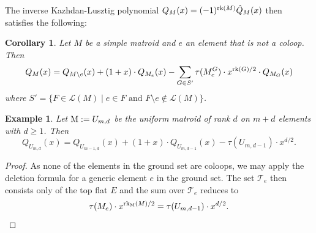 \documentclass[11pt]{article}
\newcommand{\calL}{\mathcal{L}}
\newcommand{\rank}{\normalfont\text{rk}}
\newcommand{\M}{\normalfont\text{M}}
\newcommand{\rk}{\normalfont\text{rk}}
\newtheorem{corollary}[theorem]{Corollary}
\newtheorem{example}[theorem]{Example}
\theoremstyle{remark}
\begin{document}
The inverse Kazhdan-Lusztig polynomial $Q_M(x) = (-1)^{\rank(M)}\hat{Q}_M(x)$ then satisfies the following:
\begin{corollary}
    \label{cor:deletion_formula_Q}
    Let $M$ be a simple matroid and $e$ an element that is not a coloop. Then
    \[
        Q_M(x) = Q_{M\setminus e}(x) + (1 + x)\cdot Q_{M_e}(x) -
        \sum_{G \in S'}{\tau(M^G_e)\cdot x^{\rank(G)/2} \cdot
            Q_{M_G}(x)}
    \]
    where $S' = \{F\in \calL(M)\mid e\in F \text{ and } F\setminus e \notin \calL(M)\}$.
\end{corollary}
\begin{example}\label{ex:deletion_formula_Q_uniform}
    Let $\M:=U_{m,d}$ be the uniform matroid of rank $d$ on $m+d$ elements with $d\geq 1$. Then
    \[
        Q_{U_{m,d}}(x) = Q_{U_{m-1,d}}(x) + (1 + x)\cdot Q_{U_{m,d-1}}(x) -
        \tau(U_{m,d-1})\cdot x^{d/2}.
    \]
\end{example}
\begin{proof}
    As none of the elements in the ground set are coloops, we may apply the deletion formula for a generic element $e$ in the ground set. The set $\mathscr{T}_e$ then consists only of the top flat $E$ and the sum over $\mathscr{T}_e$ reduces to \[\tau(M_e)\cdot x^{\rk_{\M}(M)/2}
        = \tau(U_{m,d-1})\cdot x^{d/2}.\]
\end{proof}
\end{document}
